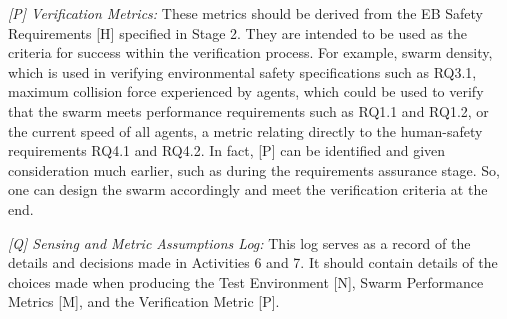 \documentclass[runningheads]{llncs}
\begin{document}
\emph{[P] Verification Metrics:} These metrics should be derived from the EB Safety Requirements [H] specified in Stage 2. 
They are intended to be used as the criteria for success within the verification process. 
For example, swarm density, which is used in verifying environmental safety specifications such as RQ3.1, maximum collision force experienced by agents, which could be used to verify that the swarm meets performance requirements such as RQ1.1 and RQ1.2, or the current speed of all agents, a metric relating directly to the human-safety requirements RQ4.1 and RQ4.2. 
In fact, [P] can be identified and given consideration much earlier, such as during the requirements assurance stage. So, one can design the swarm accordingly and meet the verification criteria at the end.
%
%
%

\emph{[Q] Sensing and Metric Assumptions Log:} This log serves as a record of the details and decisions made in Activities 6 and 7. It should contain details of the choices made when producing the Test Environment [N], Swarm Performance Metrics [M], and the Verification Metric [P].
\end{document}
